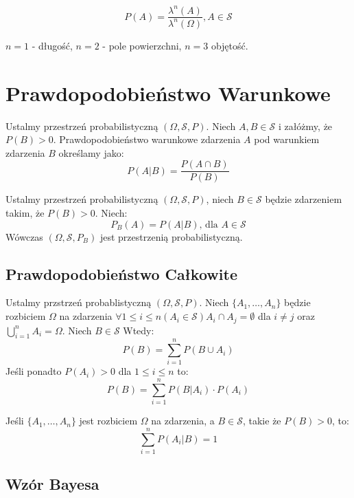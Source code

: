 \documentclass{article}
\newenvironment{definition}[1]{%
    \trivlist
    \item[\hskip\labelsep\textbf{Definition. #1.}]
    \ignorespaces
}{%
    \endtrivlist
}
\newenvironment{fact}[1]{%
    \trivlist
    \item[\hskip\labelsep\textbf{Fact. #1.}]
    \ignorespaces
}{%
    \endtrivlist
}
\begin{document}
\[
P(A) = \frac{\lambda^n(A)}{\lambda^n (\Omega)}, A \in \mathcal{S}
\]

$n = 1$ - długość, $n = 2$ - pole powierzchni, $n = 3$ objętość.

\section{Prawdopodobieństwo Warunkowe}

\begin{definition}{Prawdopodobieństwo Warunkowe}
    Ustalmy przestrzeń probabilistyczną $(\Omega, \mathcal{S}, P)$. Niech $A,B \in \mathcal{S}$ i załóżmy, że $P(B)>0$. Prawdopodobieństwo warunkowe zdarzenia $A$ pod warunkiem zdarzenia $B$ określamy jako:
    \[
    P(A|B) = \frac{P(A\cap B)}{P(B)}
    \]
\end{definition}

\begin{fact}{Prawdopodobieństwo Warunkowe jest dobrze określone}
     Ustalmy przestrzeń probabilistyczną $(\Omega, \mathcal{S}, P)$, niech $B\in\mathcal{S}$ będzie zdarzeniem takim, że $P(B)>0$. Niech:
     \[
     P_B(A) = P(A|B) \text{, dla } A\in\mathcal{S}
     \]
     Wówczas $(\Omega, \mathcal{S}, P_B)$ jest przestrzenią probabilistyczną.
\end{fact}

\subsection{Prawdopodobieństwo Całkowite}

\begin{definition}{Prawdopodobieństwo Całkowite}
    Ustalmy przstrzeń probablistyczną $(\Omega, \mathcal{S}, P)$. Niech $\{A_1,\dots,A_n\}$ będzie
    rozbiciem $\Omega$ na zdarzenia $\forall 1\leq i \leq n (A_i \in \mathcal{S}) A_i \cap A_j = \emptyset$ dla $i\neq j$ oraz $\bigcup_{i=1}^{n} A_i = \Omega$. Niech $B\in\mathcal{S}$ Wtedy:
    \[
    P(B) = \sum_{i=1}^{n} P(B\cup A_i)
    \]
    Jeśli ponadto $P(A_i) > 0$ dla $1\leq i \leq n$ to:
    \[
    P(B) = \sum_{i=1}^{n} P(B|A_i) \cdot P(A_i)
    \]
\end{definition}

\begin{fact}{Rozbicie}
    Jeśli $\{A_1, \dots, A_n\}$ jest rozbiciem $\Omega$ na zdarzenia, a $B\in\mathcal{S}$, takie że $P(B) > 0$, to:
    \[
    \sum_{i=1}^{n} P(A_i | B) = 1
    \]
\end{fact}

\subsection{Wzór Bayesa}
\end{document}
